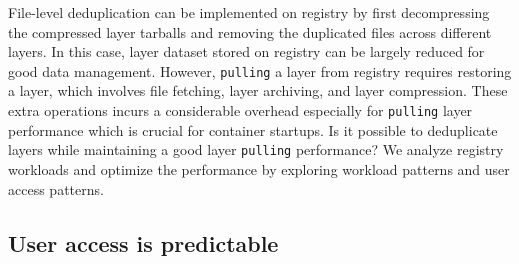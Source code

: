 File-level deduplication can be implemented on registry by first decompressing the compressed layer tarballs and 
removing the duplicated files across different layers.
In this case, 
layer dataset stored on registry can be largely reduced for good data management.
However,  
\texttt{pulling}
a layer from registry requires restoring a layer,
which involves file fetching, layer archiving, and layer compression.
These extra operations incurs a considerable overhead especially for  
\texttt{pulling} layer performance which is crucial for container startups. 
Is it possible to deduplicate layers while maintaining a good layer \texttt{pulling} performance?
We analyze registry workloads and 
optimize the performance by exploring workload patterns and user access patterns.   


\subsection{User access is predictable}


